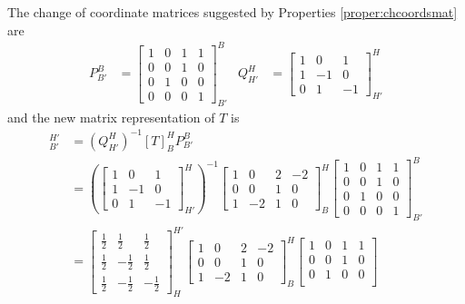 \begin{solution}
The change of coordinate matrices suggested by Properties \ref{proper:chcoordsmat} are
\begin{align*}
P_{B'}^B &= 
\begin{bmatrix}
1 & 0 & 1 & 1 \\
0 & 0 & 1 & 0 \\
0 & 1 & 0 & 0 \\
0 & 0 & 0 & 1
\end{bmatrix}_{B'}^B
&
Q_{H'}^H &= 
\begin{bmatrix}
1 & 0 & 1 \\
1 & -1 & 0 \\
0 & 1 & -1
\end{bmatrix}_{H'}^H
\end{align*}
and the new matrix representation of $T$ is
\begin{align*}
[T]_{B'}^{H'} &= (Q_{H'}^H)^{-1} [T]_B^H P_{B'}^B \\
&= \left(\begin{bmatrix}
1 & 0 & 1 \\
1 & -1 & 0 \\
0 & 1 & -1
\end{bmatrix}_{H'}^H\right)^{-1}
\begin{bmatrix}
1 & 0 & 2 & -2 \\
0 & 0 & 1 & 0 \\
1 & -2 & 1 & 0
\end{bmatrix}_B^H
\begin{bmatrix}
1 & 0 & 1 & 1 \\
0 & 0 & 1 & 0 \\
0 & 1 & 0 & 0 \\
0 & 0 & 0 & 1
\end{bmatrix}_{B'}^B \\
&= \begin{bmatrix}
\frac{1}{2} & \frac{1}{2} & \frac{1}{2} \\
\frac{1}{2} & -\frac{1}{2} & \frac{1}{2} \\
\frac{1}{2} & -\frac{1}{2} & -\frac{1}{2}
\end{bmatrix}_{H}^{H'}
\begin{bmatrix}
1 & 0 & 2 & -2 \\
0 & 0 & 1 & 0 \\
1 & -2 & 1 & 0
\end{bmatrix}_B^H
\begin{bmatrix}
1 & 0 & 1 & 1 \\
0 & 0 & 1 & 0 \\
0 & 1 & 0 & 0 \\

\end{bmatrix}
\end{align*}
\end{solution}
